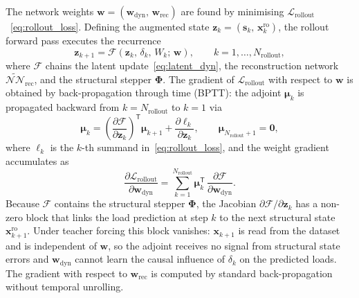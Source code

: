The network weights $\mathbf{w} = (\mathbf{w}_\mathrm{dyn},\,\mathbf{w}_\mathrm{rec})$
are found by minimising $\mathcal{L}_\mathrm{rollout}$~\eqref{eq:rollout_loss}. Defining
the augmented state $\mathbf{z}_k = (\mathbf{s}_k,\,\mathbf{x}_k^\mathrm{ro})$, the
rollout forward pass executes the recurrence
\begin{equation}
  \mathbf{z}_{k+1} = \mathcal{F}(\mathbf{z}_k,\,\delta_k,\,W_k;\,\mathbf{w}),
  \qquad k = 1,\ldots,N_\mathrm{rollout},
\label{eq:rollout_map}
\end{equation}
where $\mathcal{F}$ chains the latent update~\eqref{eq:latent_dyn}, the reconstruction
network $\widetilde{\mathcal{NN}}_\mathrm{rec}$, and the structural stepper $\boldsymbol{\Phi}$.
The gradient of $\mathcal{L}_\mathrm{rollout}$ with respect to $\mathbf{w}$ is obtained by
back-propagation through time (BPTT): the adjoint $\boldsymbol{\mu}_k$ is propagated
backward from $k = N_\mathrm{rollout}$ to $k = 1$ via
\begin{equation}
  \boldsymbol{\mu}_{k} =
      \left(\frac{\partial \mathcal{F}}{\partial \mathbf{z}_k}\right)^\mathsf{T}
      \boldsymbol{\mu}_{k+1}
      + \frac{\partial \ell_k}{\partial \mathbf{z}_k},
  \qquad \boldsymbol{\mu}_{N_\mathrm{rollout}+1} = \mathbf{0},
\label{eq:bptt}
\end{equation}
where $\ell_k$ is the $k$-th summand in~\eqref{eq:rollout_loss}, and the weight gradient
accumulates as
\[
  \frac{\partial \mathcal{L}_\mathrm{rollout}}{\partial \mathbf{w}_\mathrm{dyn}} =
      \sum_{k=1}^{N_\mathrm{rollout}}
      \boldsymbol{\mu}_k^\mathsf{T}\,
      \frac{\partial \mathcal{F}}{\partial \mathbf{w}_\mathrm{dyn}}.
\]
Because $\mathcal{F}$ contains the structural stepper $\boldsymbol{\Phi}$, the Jacobian
$\partial\mathcal{F}/\partial\mathbf{z}_k$ has a non-zero block that links the load
prediction at step $k$ to the next structural state $\mathbf{x}_{k+1}^\mathrm{ro}$.
Under teacher forcing this block vanishes: $\mathbf{x}_{k+1}$ is read from the dataset
and is independent of $\mathbf{w}$, so the adjoint receives no signal from structural
state errors and $\mathbf{w}_\mathrm{dyn}$ cannot learn the causal influence of $\delta_k$
on the predicted loads. The gradient with respect to $\mathbf{w}_\mathrm{rec}$ is computed
by standard back-propagation without temporal unrolling.

